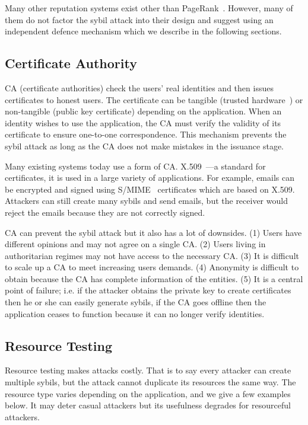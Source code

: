 Many other reputation systems exist other than
PageRank~\cite{kamvar2003eigentrust, srivatsa2005trustguard,
  nandi2005scrivener}. However, many of them do not factor the sybil attack into
their design and suggest using an independent defence mechanism which we
describe in the following sections.

\subsection{Certificate Authority}\label{sec:cert-authority}
CA (certificate authorities) check the users' real identities and then issues
certificates to honest users. The certificate can be tangible (trusted
hardware~\cite{newsome2004sybil}) or non-tangible (public key certificate)
depending on the application. When an identity wishes to use the application,
the CA must verify the validity of its certificate to ensure one-to-one
correspondence. This mechanism prevents the sybil attack as long as the CA does
not make mistakes in the issuance stage.

Many existing systems today use a form of CA.
X.509~\cite{housley2002internet}---a standard for certificates, it is used in a
large variety of applications. For example, emails can be encrypted and signed
using S/MIME~\cite{ramsdell2010secure} certificates which are based on X.509.
Attackers can still create many sybils and send emails, but the receiver would
reject the emails because they are not correctly signed.

CA can prevent the sybil attack but it also has a lot of downsides. (1) Users
have different opinions and may not agree on a single CA. (2) Users living in
authoritarian regimes may not have access to the necessary CA. (3) It is
difficult to scale up a CA to meet increasing users demands. (4) Anonymity is
difficult to obtain because the CA has complete information of the entities. (5)
It is a central point of failure; i.e. if the attacker obtains the private key
to create certificates then he or she can easily generate sybils, if the CA goes
offline then the application ceases to function because it can no longer verify
identities.


\subsection{Resource Testing}\label{sec:resource-testing}
Resource testing makes attacks costly. That is to say every attacker can create
multiple sybils, but the attack cannot duplicate its resources the same way. The
resource type varies depending on the application, and we give a few examples
below. It may deter casual attackers but its usefulness degrades for resourceful
attackers.

